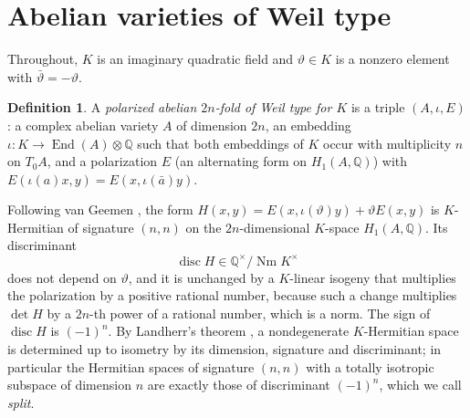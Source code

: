 \documentclass[11pt]{amsart}
\theoremstyle{definition}
\newtheorem{definition}[theorem]{Definition}
\theoremstyle{remark}
\newcommand{\Q}{\mathbb Q}
\newcommand{\End}{\operatorname{End}}
\newcommand{\Nm}{\operatorname{Nm}}
\newcommand{\disc}{\operatorname{disc}}
\begin{document}
\section{Abelian varieties of Weil type}\label{sec:weil}

Throughout, $K$ is an imaginary quadratic field and $\vartheta\in K$ is a nonzero element with $\bar\vartheta=-\vartheta$.

\begin{definition}\label{def:weiltype}
A \emph{polarized abelian $2n$-fold of Weil type for $K$} is a triple $(A,\iota,E)$: a complex abelian variety $A$ of dimension $2n$, an embedding $\iota\colon K\to\End(A)\otimes\Q$ such that both embeddings of $K$ occur with multiplicity $n$ on $T_0A$, and a polarization $E$ (an alternating form on $H_1(A,\Q)$) with $E(\iota(a)x,y)=E(x,\iota(\bar a)y)$.
\end{definition}

Following van Geemen \cite[Lemma~5.2]{vanGeemen}, the form $H(x,y)=E(x,\iota(\vartheta)y)+\vartheta E(x,y)$ is $K$-Hermitian of signature $(n,n)$ on the $2n$-dimensional $K$-space $H_1(A,\Q)$. Its discriminant
\[
\disc H\in\Q^\times/\Nm K^\times
\]
does not depend on $\vartheta$, and it is unchanged by a $K$-linear isogeny that multiplies the polarization by a positive rational number, because such a change multiplies $\det H$ by a $2n$-th power of a rational number, which is a norm. The sign of $\disc H$ is $(-1)^n$. By Landherr's theorem \cite[\S5.4]{vanGeemen}, a nondegenerate $K$-Hermitian space is determined up to isometry by its dimension, signature and discriminant; in particular the Hermitian spaces of signature $(n,n)$ with a totally isotropic subspace of dimension $n$ are exactly those of discriminant $(-1)^n$, which we call \emph{split}.
\end{document}
